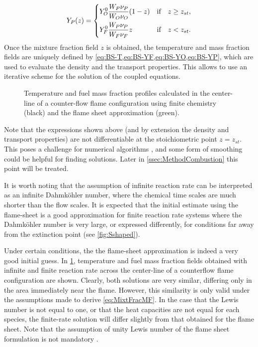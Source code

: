 \begin{equation}\label{eq:BS-YP}
	Y_P(z) =
	\begin{dcases}
		Y_O^0\frac{W_P\nu_P}{W_O\nu_O}(1-z) & \text{if} \quad z \geq z_{st}, \\
		Y_F^0\frac{W_P\nu_P}{W_F\nu_F}z     & \text{if} \quad z < z_{st}.
	\end{dcases}
\end{equation}
Once the mixture fraction field $z$ is obtained, the temperature and mass fraction fields are uniquely defined by \cref{eq:BS-T,eq:BS-YF,eq:BS-YO,eq:BS-YP}, which are used to evaluate the density and the transport properties. This allows to use an iterative scheme for the solution of the coupled equations.


\begin{figure}[t]
	\centering
	\caption[Temperature and fuel mass fraction profiles calculated in the center-line of a counter-flow flame configuration using finite chemistry and the flame sheet approximation.]{Temperature and fuel mass fraction profiles calculated in the center-line of a counter-flow flame configuration using finite chemistry (black) and the flame sheet approximation (green). }
	\label{fig:MixtureFraction_finiteRateComparison}
\end{figure}

Note that the expressions shown above (and by extension the density and transport properties) are not differentiable at the stoichiometric point $z =z_{st}$. This poses a challenge for numerical algorithms \parencite{rauwoensConservativeDiscreteCompatibilityconstraint2009}, and some form of smoothing could be helpful for finding solutions. Later in \cref{ssec:MethodCombustion} this point will be treated.

It is worth noting that the assumption of infinite reaction rate can be interpreted as an infinite Dahmköhler number, where the chemical time scales are much shorter than the flow scales. It is expected that the initial estimate using the flame-sheet is a good approximation for finite reaction rate systems where the Dahmköhler number is very large, or expressed differently, for conditions far away from the extinction point (see \cref{fig:Sshaped}). 

Under certain conditions, the the flame-sheet approximation is indeed a very good initial guess. In \cref{fig:MixtureFraction_finiteRateComparison}, temperature and fuel mass fraction fields obtained with infinite and finite reaction rate across the center-line of a counterflow flame configuration are shown. Clearly, both solutions are very similar, differing only in the area immediately near the flame. However, this similarity is only valid under the assumptions made to derive \cref{eq:MixtFracMF}. In the case that the Lewis number is not equal to one, or that the heat capacities are not equal for each species, the finite-rate solution will differ slightly from that obtained for the flame sheet.  Note that the assumption of unity Lewis number of the flame sheet formulation is not mandatory \parencite{Lin2009N9S}.

